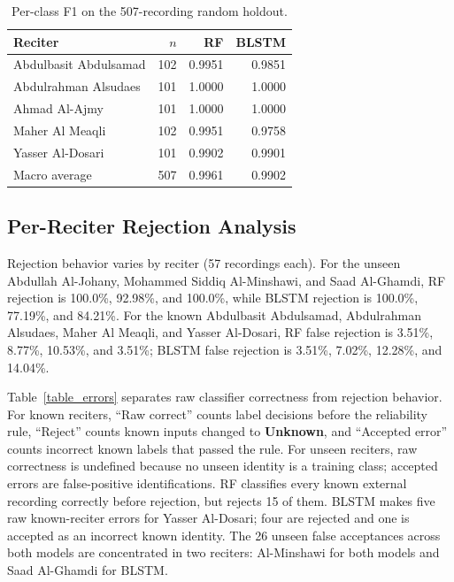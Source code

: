 \documentclass[a4paper,conference]{IEEEtran}
\begin{document}
\begin{table}[htbp]
\centering
\caption{Per-class F1 on the 507-recording random holdout.}
\label{table_holdout_f1}
\renewcommand{\arraystretch}{1.06}
\setlength{\tabcolsep}{4pt}
\begin{tabular}{l r r r}
\toprule
\textbf{Reciter} & \textbf{$n$} & \textbf{RF} & \textbf{BLSTM} \\
\midrule
Abdulbasit Abdulsamad & 102 & 0.9951 & 0.9851 \\
Abdulrahman Alsudaes & 101 & 1.0000 & 1.0000 \\
Ahmad Al-Ajmy & 101 & 1.0000 & 1.0000 \\
Maher Al Meaqli & 102 & 0.9951 & 0.9758 \\
Yasser Al-Dosari & 101 & 0.9902 & 0.9901 \\
\midrule
Macro average & 507 & 0.9961 & 0.9902 \\
\bottomrule
\end{tabular}
\end{table}

\subsection{Per-Reciter Rejection Analysis}

Rejection behavior varies by reciter (57 recordings each). For the unseen Abdullah Al-Johany, Mohammed Siddiq Al-Minshawi, and Saad Al-Ghamdi, RF rejection is 100.0\%, 92.98\%, and 100.0\%, while BLSTM rejection is 100.0\%, 77.19\%, and 84.21\%. For the known Abdulbasit Abdulsamad, Abdulrahman Alsudaes, Maher Al Meaqli, and Yasser Al-Dosari, RF false rejection is 3.51\%, 8.77\%, 10.53\%, and 3.51\%; BLSTM false rejection is 3.51\%, 7.02\%, 12.28\%, and 14.04\%.

Table~\ref{table_errors} separates raw classifier correctness from rejection behavior. For known reciters, ``Raw correct'' counts label decisions before the reliability rule, ``Reject'' counts known inputs changed to \textbf{Unknown}, and ``Accepted error'' counts incorrect known labels that passed the rule. For unseen reciters, raw correctness is undefined because no unseen identity is a training class; accepted errors are false-positive identifications. RF classifies every known external recording correctly before rejection, but rejects 15 of them. BLSTM makes five raw known-reciter errors for Yasser Al-Dosari; four are rejected and one is accepted as an incorrect known identity. The 26 unseen false acceptances across both models are concentrated in two reciters: Al-Minshawi for both models and Saad Al-Ghamdi for BLSTM.
\end{document}
